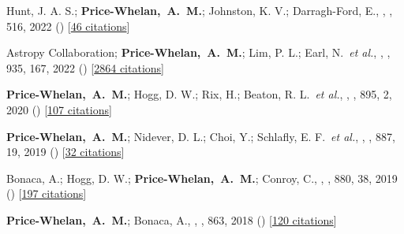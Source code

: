 \item[{\color{deemph}\scriptsize11}]Hunt, J. A. S.; \textbf{Price-Whelan,~A.~M.}; Johnston, K. V.; Darragh-Ford, E., , \mnras, 516, 2022 () [\href{http://adsabs.harvard.edu/abs/2022MNRAS.516L...7H}{46 citations}]

\item[{\color{deemph}\scriptsize10}]Astropy Collaboration; \textbf{Price-Whelan,~A.~M.}; Lim, P. L.; Earl, N.~\textit{et al.}, , \apj, 935, 167, 2022 () [\href{http://adsabs.harvard.edu/abs/2022ApJ...935..167A}{2864 citations}]

\item[{\color{deemph}\scriptsize9}]\textbf{Price-Whelan,~A.~M.}; Hogg, D. W.; Rix, H.; Beaton, R. L.~\textit{et al.}, , \apj, 895, 2, 2020 () [\href{http://adsabs.harvard.edu/abs/2020ApJ...895....2P}{107 citations}]

\item[{\color{deemph}\scriptsize8}]\textbf{Price-Whelan,~A.~M.}; Nidever, D. L.; Choi, Y.; Schlafly, E. F.~\textit{et al.}, , \apj, 887, 19, 2019 () [\href{http://adsabs.harvard.edu/abs/2019ApJ...887...19P}{32 citations}]

\item[{\color{deemph}\scriptsize7}]Bonaca, A.; Hogg, D. W.; \textbf{Price-Whelan,~A.~M.}; Conroy, C., , \apj, 880, 38, 2019 () [\href{http://adsabs.harvard.edu/abs/2019ApJ...880...38B}{197 citations}]

\item[{\color{deemph}\scriptsize6}]\textbf{Price-Whelan,~A.~M.}; Bonaca, A., , \apj, 863, 2018 () [\href{http://adsabs.harvard.edu/abs/2018ApJ...863L..20P}{120 citations}]

